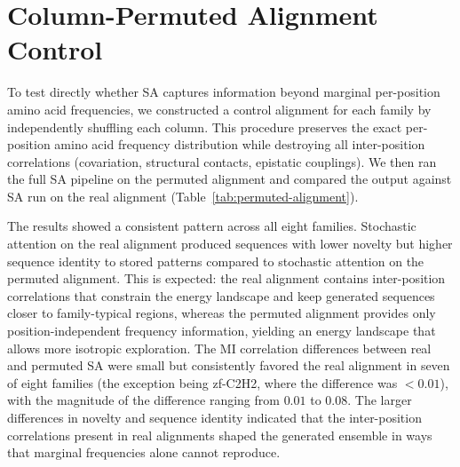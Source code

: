 \section{Column-Permuted Alignment Control}\label{si:permuted-alignment}

To test directly whether SA captures information beyond marginal per-position amino acid frequencies, we constructed a control alignment for each family by independently shuffling each column. This procedure preserves the exact per-position amino acid frequency distribution while destroying all inter-position correlations (covariation, structural contacts, epistatic couplings). We then ran the full SA pipeline on the permuted alignment and compared the output against SA run on the real alignment (Table~\ref{tab:permuted-alignment}).

The results showed a consistent pattern across all eight families. Stochastic attention on the real alignment produced sequences with lower novelty but higher sequence identity to stored patterns compared to stochastic attention on the permuted alignment. This is expected: the real alignment contains inter-position correlations that constrain the energy landscape and keep generated sequences closer to family-typical regions, whereas the permuted alignment provides only position-independent frequency information, yielding an energy landscape that allows more isotropic exploration. The MI correlation differences between real and permuted SA were small but consistently favored the real alignment in seven of eight families (the exception being zf-C2H2, where the difference was $<0.01$), with the magnitude of the difference ranging from $0.01$ to $0.08$. The larger differences in novelty and sequence identity indicated that the inter-position correlations present in real alignments shaped the generated ensemble in ways that marginal frequencies alone cannot reproduce.

